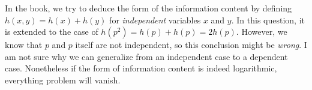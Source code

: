 \begin{afternote}
	In the book, we try to deduce the form of the information content by defining $h(x, y) = h(x) + h(y)$ for \emph{independent} variables $x$ and $y$. In this question, it is extended to the case of $h(p^2) = h(p) + h(p) = 2h(p)$. However, we know that $p$ and $p$ itself are not independent, so this conclusion might be \emph{wrong}. I am not sure why we can generalize from an independent case to a dependent case. Nonetheless if the form of information content is indeed logarithmic, everything problem will vanish.
\end{afternote}